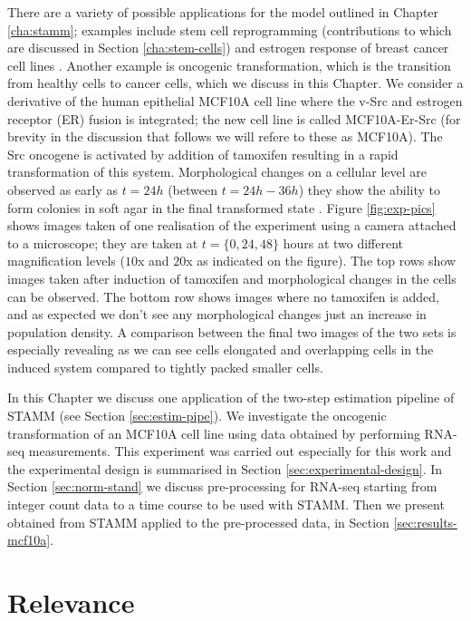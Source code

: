 There are a variety of possible applications for the model outlined in Chapter \ref{cha:stamm}; examples include stem cell reprogramming \citep{Armond:2013} (contributions to which are discussed in Section \ref{cha:stem-cells}) and estrogen response of breast cancer cell lines \citep{Casale:2013}. Another example is oncogenic transformation, which is the transition from healthy cells to cancer cells, which we discuss in this Chapter. We consider a derivative of the human epithelial MCF10A cell line where the v-Src and estrogen receptor (ER) fusion is integrated; the new cell line is called MCF10A-Er-Src \citep{Hirsch:2010ec} (for brevity in the discussion that follows we will refere to these as MCF10A). The Src oncogene is activated by addition of tamoxifen resulting in a rapid transformation of this system. Morphological changes on a cellular level are observed as early as $t=24h$ (between $t=24h-36h$) they show the ability to form colonies in soft agar in the final transformed state \citep{Hirsch:2010ec}. Figure \ref{fig:exp-pics} shows images taken of one realisation of the experiment using a camera attached to a microscope; they are taken at $t= \lbrace 0, 24, 48 \rbrace$ hours at two different magnification levels ($10$x and $20$x as indicated on the figure). The top rows show images taken after induction of tamoxifen and morphological changes in the cells can be observed. The bottom row shows images where no tamoxifen is added, and as expected we don't see any morphological changes just an increase in population density. A comparison between the final two images of the two sets is especially revealing as we can see cells elongated and overlapping cells in the induced system compared to tightly packed smaller cells.

In this Chapter we discuss one application of the two-step estimation pipeline of STAMM (see Section \ref{sec:estim-pipe}). We investigate the oncogenic transformation of an MCF10A cell line using  data obtained by performing RNA-seq measurements. This experiment was carried out especially for this work and the experimental design is summarised in Section \ref{sec:experimental-design}. In Section \ref{sec:norm-stand} we discuss pre-processing for RNA-seq starting from integer count data to a time course to be used with STAMM. Then we present obtained from STAMM applied to the pre-processed data, in Section \ref{sec:results-mcf10a}.

\section{Relevance}
\label{sec:relevance}


